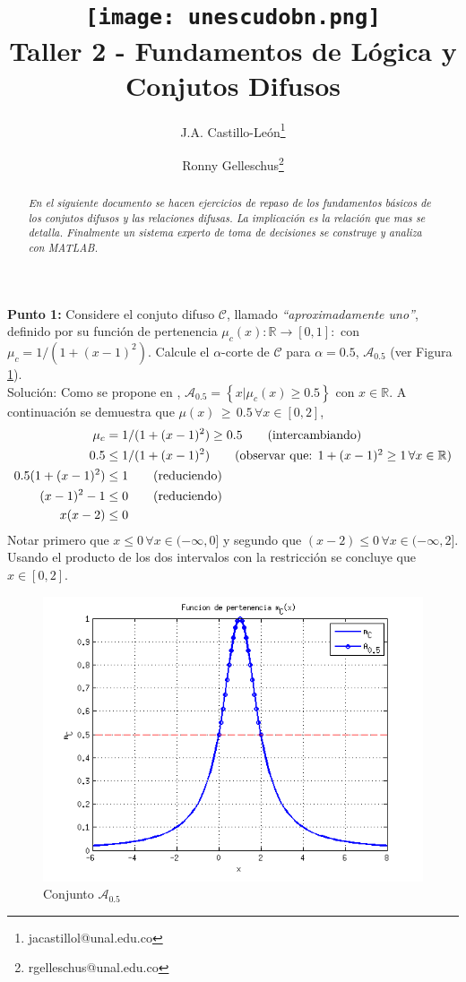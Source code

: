 \documentclass[10pt,onecolumn,twoside,letterpaper]{article}
\title{\vspace{-0.8cm}\texttt{[image: unescudobn.png]}\\\vspace{-0.0cm}
  \LARGE \textbf{Taller 2 - Fundamentos de L\'ogica y Conjutos Difusos}}
\author{J.A. Castillo-Le\'on\thanks{jacastillol@unal.edu.co} \and Ronny Gelleschus\thanks{rgelleschus@unal.edu.co}}
\date{}
\begin{document}
\maketitle
\begin{abstract}\noindent\small\textit{En el siguiente documento se hacen ejercicios de repaso de los fundamentos b\'asicos de los conjutos difusos y las relaciones difusas. La implicaci\'on es la relaci\'on que mas se detalla. Finalmente un sistema experto de toma de decisiones se construye y analiza con MATLAB.}
\end{abstract}\vspace{1cm}


\par{\bf \large Punto 1:} Considere el conjuto difuso $\mathcal{C}$, llamado \emph{``aproximadamente uno''}, definido por su funci\'on de pertenencia $\mu_c(x):\mathbb{R}\to[0,1]:$ con $\mu_c=1/(1+(x-1)^2)$. Calcule el $\alpha$-corte de $\mathcal{C}$ para $\alpha=0.5$, $\mathcal{A}_{0.5}$ (ver Figura \ref{fig:Acut05}).\\
Soluci\'on: Como se propone en \cite{Babuska1999}, $\mathcal{A}_{0.5}=\left\{x|\mu_c(x)\geq0.5\right\}$ con $x\in\mathbb{R}$. A continuaci\'on se demuestra que $\mu(x)\,\geq\,0.5\,\forall x \in [0,2]$,
\begin{align*}\small
  \mu_c&=1/(1+(x-1)^2)\geq 0.5 \tag{intercambiando}
  \\0.5&\leq 1/(1+(x-1)^2) \tag{observar que: $1+(x-1)^2\geq 1\,\forall x\in\mathbb{R}$}
  \\0.5(1+(x-1)^2)&\leq 1 \tag{reduciendo}
  \\(x-1)^2-1&\leq 0 \tag{reduciendo}
  \\x(x-2)&\leq 0 
\end{align*}
Notar primero que $x\leq 0\,\forall x\in(-\infty,0]$ y segundo que $(x-2)\leq0\,\forall x\in(-\infty,2]$. Usando el producto de los dos intervalos con la restricci\'on se concluye que $x\in [0,2]$.
\begin{figure}[H]
 \centering
 \includegraphics[scale=0.6]{A_05.png}
 \caption{Conjunto $\mathcal{A}_{0.5}$}
 \label{fig:Acut05}
\end{figure}
\end{document}
